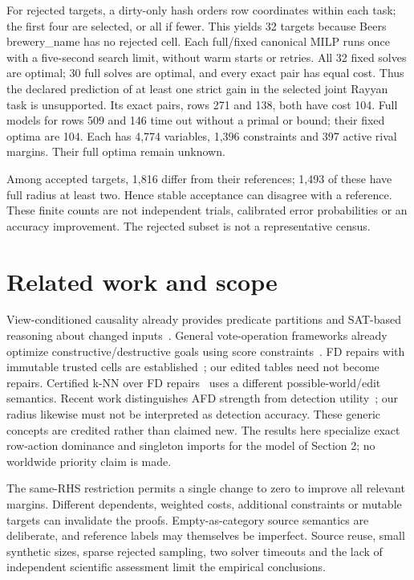 \documentclass[11pt]{article}
\begin{document}
For rejected targets, a dirty-only hash orders row coordinates within each
task; the first four are selected, or all if fewer. This yields 32 targets
because Beers brewery\_name has no rejected cell. Each full/fixed canonical
MILP runs once with a five-second search limit, without warm starts or retries.
All 32 fixed solves are optimal; 30 full solves are optimal, and every exact
pair has equal cost. Thus the declared prediction of at least one strict gain
in the selected joint Rayyan task is unsupported. Its exact pairs, rows 271
and 138, both have cost 104. Full models for rows 509 and 146 time out without
a primal or bound; their fixed optima are 104. Each has 4,774 variables, 1,396
constraints and 397 active rival margins. Their full optima remain unknown.

Among accepted targets, 1,816 differ from their references; 1,493 of these have
full radius at least two. Hence stable acceptance can disagree with a reference.
These finite counts are not independent trials, calibrated error probabilities
or an accuracy improvement. The rejected subset is not a representative census.

\section{Related work and scope}
View-conditioned causality already provides predicate partitions and SAT-based
reasoning about changed inputs~\cite{vcc}. General vote-operation frameworks
already optimize constructive/destructive goals using score constraints~\cite{xia}.
FD repairs with immutable trusted cells are established~\cite{repairs}; our edited
tables need not become repairs. Certified k-NN over FD repairs~\cite{knn}
uses a different possible-world/edit semantics. Recent work distinguishes AFD
strength from detection utility~\cite{wan}; our radius likewise must not be
interpreted as detection accuracy. These generic concepts are credited rather
than claimed new. The results here specialize exact row-action dominance and
singleton imports for the model of Section 2; no worldwide priority claim is made.

The same-RHS restriction permits a single change to zero to improve all
relevant margins. Different dependents, weighted costs, additional constraints
or mutable targets can invalidate the proofs. Empty-as-category source semantics
are deliberate, and reference labels may themselves be imperfect. Source reuse,
small synthetic sizes, sparse rejected sampling, two solver timeouts and the
lack of independent scientific assessment limit the empirical conclusions.
\end{document}
